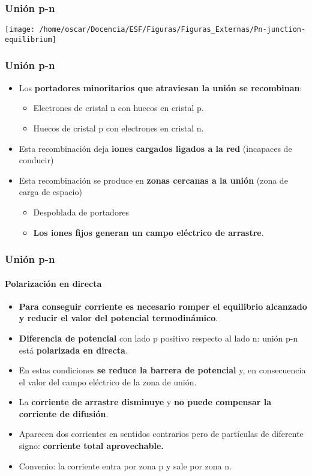 \documentclass[xcolor=dvipsnames]{beamer}
\begin{document}
\begin{frame}[plain]
  \frametitle{Unión p-n}

  \begin{center}
    \texttt{[image: /home/oscar/Docencia/ESF/Figuras/Figuras\_Externas/Pn-junction-equilibrium]}
    \par\end{center}


\end{frame}
\begin{frame}
  \frametitle{Unión p-n}
  \begin{itemize}
  \item Los \textbf{portadores minoritarios que atraviesan la unión se
      recombinan}:

    \begin{itemize}
    \item Electrones de cristal n con huecos en cristal p.
    \item Huecos de cristal p con electrones en cristal n.
    \end{itemize}
  \item Esta recombinación deja \textbf{iones cargados ligados a la
      red} (incapaces de conducir)
  \item Esta recombinación se produce en \textbf{zonas cercanas a la
      unión} (zona de carga de espacio)

    \begin{itemize}
    \item Despoblada de portadores
    \item \textbf{Los iones fijos generan un campo eléctrico de
        arrastre}.
    \end{itemize}
  \end{itemize}

\end{frame}
\begin{frame}
  \frametitle{Unión p-n}


  \framesubtitle{Polarización en directa}
  \begin{itemize}
  \item \textbf{Para conseguir corriente es necesario romper el
      equilibrio alcanzado y reducir el valor del potencial
      termodinámico}.
  \item \textbf{Diferencia de potencial} con lado p positivo respecto
    al lado n: unión p-n está \textbf{polarizada en directa}.
  \item En estas condiciones \textbf{se reduce la barrera de
      potencial} y, en consecuencia el valor del campo eléctrico de la
    zona de unión.
  \item La \textbf{corriente de arrastre disminuye} y \textbf{no puede
      compensar la corriente de difusión}.
  \item Aparecen dos corrientes en sentidos contrarios pero de
    partículas de diferente signo: \textbf{corriente total
      aprovechable.}
  \item Convenio: la corriente entra por zona p y sale por zona n.
  \end{itemize}

\end{frame}
\end{document}
